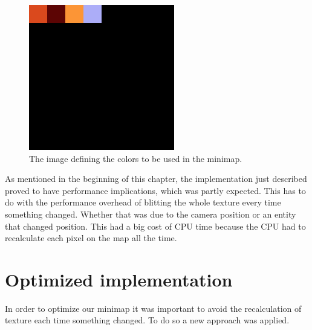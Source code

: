 \begin{figure}
	\centering
    \includegraphics[scale=.5]{figures/minimap/minimap_colors.png}
    \caption{The image defining the colors to be used in the minimap.}
    \label{minimap:colordefinition}
\end{figure}

As mentioned in the beginning of this chapter, the implementation just
described proved to have performance implications, which was partly expected. 
This has to do with the performance overhead of blitting the whole texture every time something changed.
Whether that was due to the camera position or an entity that changed position.
This had a big cost of CPU time because the CPU had to recalculate each pixel on the map all the time.


\section{Optimized implementation}
In order to optimize our minimap it was important to avoid the recalculation of texture each time something changed.
To do so a new approach was applied.

